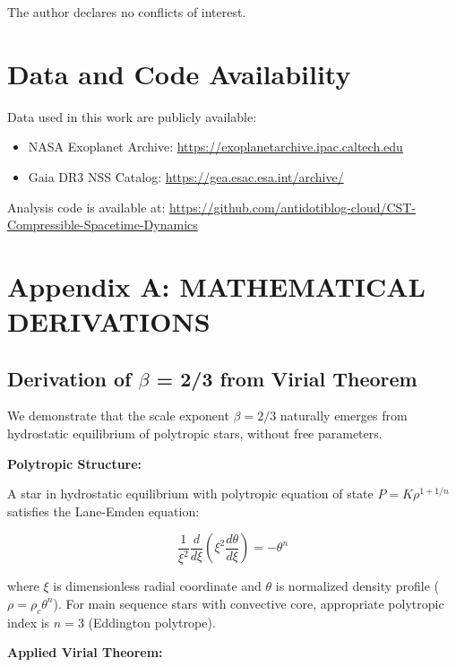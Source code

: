 \documentclass[11pt,a4paper]{article}
\begin{document}
The author declares no conflicts of interest.

\hypertarget{data-and-code-availability}{%
\section*{Data and Code Availability}\label{data-and-code-availability}}

Data used in this work are publicly available:
\begin{itemize}
  \item NASA Exoplanet Archive: \url{https://exoplanetarchive.ipac.caltech.edu}
  \item Gaia DR3 NSS Catalog: \url{https://gea.esac.esa.int/archive/}
\end{itemize}

Analysis code is available at: \url{https://github.com/antidotiblog-cloud/CST-Compressible-Spacetime-Dynamics}

\hypertarget{appendix-a-mathematical-derivations}{%
\section*{Appendix A: MATHEMATICAL
DERIVATIONS}\label{appendix-a-mathematical-derivations}}

\hypertarget{a.1-derivation-of-ux3b2-23-from-virial-theorem}{%
\subsection*{Derivation of $\beta$ = 2/3 from Virial
Theorem}\label{a.1-derivation-of-ux3b2-23-from-virial-theorem}}

We demonstrate that the scale exponent \(\beta = 2/3\) naturally emerges
from hydrostatic equilibrium of polytropic stars, without free
parameters.

\textbf{Polytropic Structure:}

A star in hydrostatic equilibrium with polytropic equation of state
\(P = K\rho^{1+1/n}\) satisfies the Lane-Emden equation:

\[\frac{1}{\xi^2}\frac{d}{d\xi}\left(\xi^2 \frac{d\theta}{d\xi}\right) = -\theta^n\]

where \(\xi\) is dimensionless radial coordinate and \(\theta\) is
normalized density profile (\(\rho = \rho_c \theta^n\)). For main
sequence stars with convective core, appropriate polytropic index is
\(n = 3\) (Eddington polytrope).

\textbf{Applied Virial Theorem:}
\end{document}
